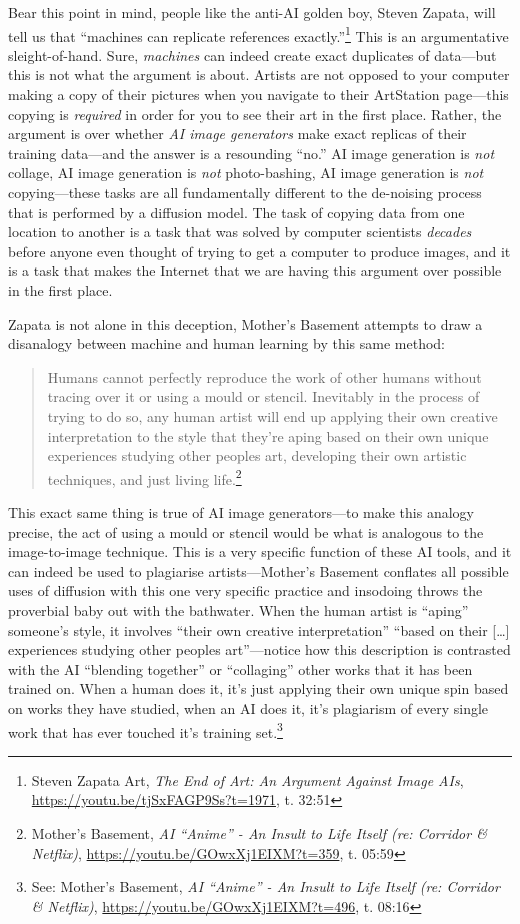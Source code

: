 \documentclass[11pt]{article}
\begin{document}
Bear this point in mind, people like the anti-AI golden boy, Steven Zapata, will tell us that ``machines can replicate references exactly.''\footnote{Steven Zapata Art, \emph{The End of Art: An Argument Against Image AIs}, \url{https://youtu.be/tjSxFAGP9Ss?t=1971}, t. 32:51} This is an argumentative sleight-of-hand. Sure, \emph{machines} can indeed create exact duplicates of data---but this is not what the argument is about. Artists are not opposed to your computer making a copy of their pictures when you navigate to their ArtStation page---this copying is \emph{required} in order for you to see their art in the first place. Rather, the argument is over whether \emph{AI image generators} make exact replicas of their training data---and the answer is a resounding ``no.'' AI image generation is \emph{not} collage, AI image generation is \emph{not} photo-bashing, AI image generation is \emph{not} copying---these tasks are all fundamentally different to the de-noising process that is performed by a diffusion model. The task of copying data from one location to another is a task that was solved by computer scientists \emph{decades} before anyone even thought of trying to get a computer to produce images, and it is a task that makes the Internet that we are having this argument over possible in the first place.

Zapata is not alone in this deception, Mother's Basement attempts to draw a disanalogy between machine and human learning by this same method:

\begin{quote}
Humans cannot perfectly reproduce the work of other humans without tracing over it or using a mould or stencil. Inevitably in the process of trying to do so, any human artist will end up applying their own creative interpretation to the style that they're aping based on their own unique experiences studying other peoples art, developing their own artistic techniques, and just living life.\footnote{Mother's Basement, \emph{AI ``Anime'' - An Insult to Life Itself (re: Corridor \& Netflix)}, \url{https://youtu.be/GOwxXj1EIXM?t=359}, t. 05:59}
\end{quote}

This exact same thing is true of AI image generators---to make this analogy precise, the act of using a mould or stencil would be what is analogous to the image-to-image technique. This is a very specific function of these AI tools, and it can indeed be used to plagiarise artists---Mother's Basement conflates all possible uses of diffusion with this one very specific practice and insodoing throws the proverbial baby out with the bathwater. When the human artist is ``aping'' someone's style, it involves ``their own creative interpretation'' ``based on their [\ldots{}] experiences studying other peoples art''---notice how this description is contrasted with the AI ``blending together'' or ``collaging'' other works that it has been trained on. When a human does it, it's just applying their own unique spin based on works they have studied, when an AI does it, it's plagiarism of every single work that has ever touched it's training set.\footnote{See: Mother's Basement, \emph{AI ``Anime'' - An Insult to Life Itself (re: Corridor \& Netflix)}, \url{https://youtu.be/GOwxXj1EIXM?t=496}, t. 08:16}
\end{document}
